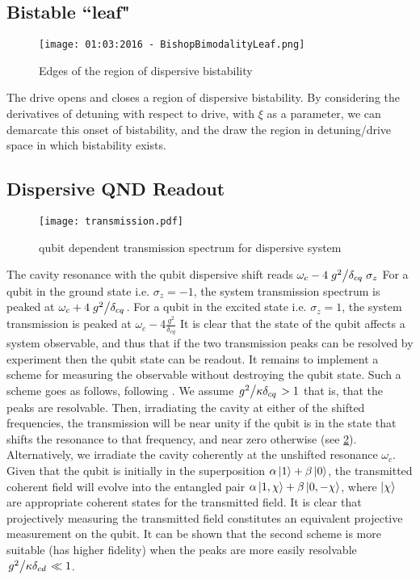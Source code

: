 \subsection{Bistable ``leaf"}
\begin{figure}[ht]
        \label{BistabilityLeaf}
        \texttt{[image: 01:03:2016 - BishopBimodalityLeaf.png]}
        \caption{Edges of the region of dispersive bistability}
\end{figure}
The drive opens and closes a region of dispersive bistability. By considering the derivatives of detuning with respect to drive, with $\xi$ as a parameter, we can demarcate this onset of bistability, and the draw the region in detuning/drive space in which bistability exists.
\subsection{Dispersive QND Readout}
\label{disp_QND_readout}
\begin{figure}[ht]
  \label{transmission}
  \centering
  \texttt{[image: transmission.pdf]}
  \caption{qubit dependent transmission spectrum for dispersive system}
\end{figure}
The cavity resonance with the qubit dispersive shift reads $\omega_c - 4\flatfrac{g^2}{\delta_{cq}}\sigma_z$
For a qubit in the ground state i.e. $\sigma_z = -1$, the system transmission spectrum is peaked at $\omega_c + 4\flatfrac{g^2}{\delta_{cq}}$.
For a qubit in the excited state i.e. $\sigma_z = 1$, the system transmission is peaked at $\omega_c - 4\frac{g^2}{\delta_{cq}}$
It is clear that the state of the qubit affects a system observable, and thus that if the two transmission peaks can be resolved by experiment then the qubit state can be readout.
It remains to  implement a scheme for measuring the observable without destroying the qubit state. 
Such a scheme goes as follows, following \cite{Blais2004a}.
We assume $\flatfrac{g^2}{\kappa\delta_{cq}} >1$ that is, that the peaks are resolvable.
Then, irradiating the cavity at either of the shifted frequencies, the transmission will be near unity if the qubit is in the state that shifts the resonance to that frequency, and near zero otherwise (see \cref{transmission}).
Alternatively, we irradiate the cavity coherently at the unshifted resonance $\omega_c$. 
Given that the qubit is initially in the superposition $\alpha \ket{1} + \beta \ket{0}$, the transmitted coherent field will evolve into the entangled pair $\alpha \ket{1, \chi} + \beta \ket{0, -\chi}$, where $\ket{\chi}$ are appropriate coherent states for the transmitted field. 
It is clear that projectively measuring the transmitted field constitutes an equivalent projective measurement on the qubit.
It can be shown \cite{Blais2004a} that the second scheme is more suitable (has higher fidelity) when the peaks are more easily resolvable $\flatfrac{g^2}{\kappa\delta_{cd}} \ll 1$.
